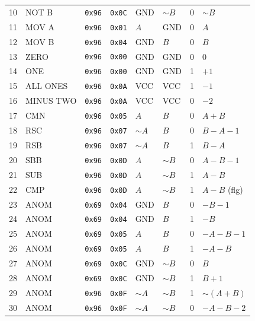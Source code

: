 \documentclass[10pt,landscape,a4paper]{article}
\begin{document}
\begin{minipage}[t]{0.31\textwidth}
\begin{tabular}{@{}rl@{\hspace{0.4em}}cc@{\hspace{0.4em}}ll@{\hspace{0.4em}}cl@{}}
    10 & NOT B & \texttt{0x96} & \texttt{0x0C} & GND & $\sim B$ & 0 & $\sim B$ \\
    11 & MOV A & \texttt{0x96} & \texttt{0x01} & $A$ & GND & 0 & $A$ \\
    12 & MOV B & \texttt{0x96} & \texttt{0x04} & GND & $B$ & 0 & $B$ \\
    13 & ZERO & \texttt{0x96} & \texttt{0x00} & GND & GND & 0 & $0$ \\
    14 & ONE & \texttt{0x96} & \texttt{0x00} & GND & GND & 1 & $+1$ \\
    15 & ALL ONES & \texttt{0x96} & \texttt{0x0A} & VCC & VCC & 1 & $-1$ \\
    16 & MINUS TWO & \texttt{0x96} & \texttt{0x0A} & VCC & VCC & 0 & $-2$ \\
    17 & CMN & \texttt{0x96} & \texttt{0x05} & $A$ & $B$ & 0 & $A+B$ \\
    18 & RSC & \texttt{0x96} & \texttt{0x07} & $\sim A$ & $B$ & 0 & $B-A-1$ \\
    19 & RSB & \texttt{0x96} & \texttt{0x07} & $\sim A$ & $B$ & 1 & $B-A$ \\
    20 & SBB & \texttt{0x96} & \texttt{0x0D} & $A$ & $\sim B$ & 0 & $A-B-1$ \\
    21 & SUB & \texttt{0x96} & \texttt{0x0D} & $A$ & $\sim B$ & 1 & $A-B$ \\
    22 & CMP & \texttt{0x96} & \texttt{0x0D} & $A$ & $\sim B$ & 1 & $A-B$ (flg) \\
    23 & ANOM & \texttt{0x69} & \texttt{0x04} & GND & $B$ & 0 & $-B-1$ \\
    24 & ANOM & \texttt{0x69} & \texttt{0x04} & GND & $B$ & 1 & $-B$ \\
    25 & ANOM & \texttt{0x69} & \texttt{0x05} & $A$ & $B$ & 0 & $-A-B-1$ \\
    26 & ANOM & \texttt{0x69} & \texttt{0x05} & $A$ & $B$ & 1 & $-A-B$ \\
    27 & ANOM & \texttt{0x69} & \texttt{0x0C} & GND & $\sim B$ & 0 & $B$ \\
    28 & ANOM & \texttt{0x69} & \texttt{0x0C} & GND & $\sim B$ & 1 & $B+1$ \\
    29 & ANOM & \texttt{0x96} & \texttt{0x0F} & $\sim A$ & $\sim B$ & 1 & $\sim(A+B)$ \\
    30 & ANOM & \texttt{0x96} & \texttt{0x0F} & $\sim A$ & $\sim B$ & 0 & $-A-B-2$ \\
    \bottomrule
    \end{tabular}
\end{minipage}%
\hfill
\end{document}
